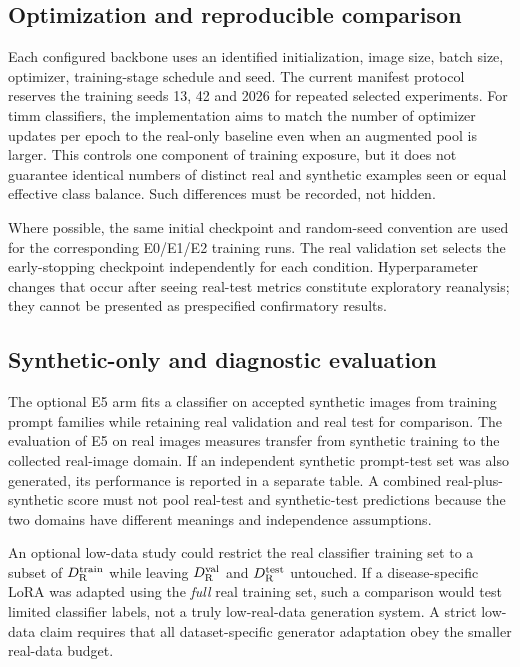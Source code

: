 \subsection{Optimization and reproducible comparison}
Each configured backbone uses an identified initialization, image size, batch size, optimizer, training-stage schedule and seed. The current manifest protocol reserves the training seeds 13, 42 and 2026 for repeated selected experiments. For timm classifiers, the implementation aims to match the number of optimizer updates per epoch to the real-only baseline even when an augmented pool is larger. This controls one component of training exposure, but it does not guarantee identical numbers of distinct real and synthetic examples seen or equal effective class balance. Such differences must be recorded, not hidden.

Where possible, the same initial checkpoint and random-seed convention are used for the corresponding E0/E1/E2 training runs. The real validation set selects the early-stopping checkpoint independently for each condition. Hyperparameter changes that occur after seeing real-test metrics constitute exploratory reanalysis; they cannot be presented as prespecified confirmatory results.

\subsection{Synthetic-only and diagnostic evaluation}
The optional E5 arm fits a classifier on accepted synthetic images from training prompt families while retaining real validation and real test for comparison. The evaluation of E5 on real images measures transfer from synthetic training to the collected real-image domain. If an independent synthetic prompt-test set was also generated, its performance is reported in a separate table. A combined real-plus-synthetic score must not pool real-test and synthetic-test predictions because the two domains have different meanings and independence assumptions.

An optional low-data study could restrict the real classifier training set to a subset of $D_{\mathrm{R}}^{\mathrm{train}}$ while leaving $D_{\mathrm{R}}^{\mathrm{val}}$ and $D_{\mathrm{R}}^{\mathrm{test}}$ untouched. If a disease-specific LoRA was adapted using the \emph{full} real training set, such a comparison would test limited classifier labels, not a truly low-real-data generation system. A strict low-data claim requires that all dataset-specific generator adaptation obey the smaller real-data budget.
